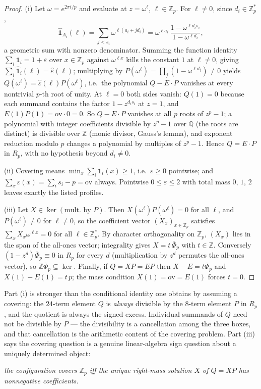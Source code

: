 \documentclass[11pt,a4paper]{article}
\numberwithin{equation}{section}
\theoremstyle{plain}
\theoremstyle{plain}
\theoremstyle{definition}
\theoremstyle{remark}
\newcommand{\Z}{\mathbb{Z}}
\begin{document}
\begin{proof}
(i) Let $\omega=e^{2\pi i/p}$ and evaluate at $z=\omega^\ell$,
$\ell\in\Z_p$. For $\ell\ne 0$, since $d_i\in\Z_p^{*}$,
\[
\widehat{\mathbf 1}_{A_i}(\ell)
=\sum_{j<s_i}\omega^{\ell(a_i+jd_i)}
=\omega^{\ell a_i}\,\frac{1-\omega^{\ell d_i s_i}}{1-\omega^{\ell d_i}},
\]
a geometric sum with nonzero denominator. Summing the function identity
$\sum_i\mathbf 1_i=1+\varepsilon$ over $x\in\Z_p$ against $\omega^{\ell x}$
kills the constant $1$ at $\ell\ne0$, giving
$\sum_i\widehat{\mathbf 1}_i(\ell)=\widehat\varepsilon(\ell)$; multiplying by
$P(\omega^\ell)=\prod_j(1-\omega^{\ell d_j})\ne 0$ yields
$Q(\omega^\ell)=\widehat\varepsilon(\ell)P(\omega^\ell)$, i.e.\ the
polynomial $Q-E\cdot P$ vanishes at every nontrivial $p$-th root of unity.
At $\ell=0$ both sides vanish: $Q(1)=0$ because each summand contains the
factor $1-z^{d_is_i}$ at $z=1$, and $E(1)P(1)=\mathrm{ov}\cdot 0=0$. So
$Q-E\cdot P$ vanishes at all $p$ roots of $z^p-1$; a polynomial with integer
coefficients divisible by $z^p-1$ over $\mathbb{Q}$ (the roots are distinct) is
divisible over $\Z$ (monic divisor, Gauss's lemma), and exponent reduction
modulo $p$ changes a polynomial by multiples of $z^p-1$. Hence
$Q=E\cdot P$ in $R_p$, with no hypothesis beyond $d_i\ne 0$.

(ii) Covering means $\min_x\sum_i\mathbf 1_i(x)\ge 1$, i.e.\ $\varepsilon\ge
0$ pointwise; and $\sum_x\varepsilon(x)=\sum_i s_i-p=\mathrm{ov}$ always.
Pointwise $0\le\varepsilon\le 2$ with total mass $0$, $1$, $2$ leaves exactly
the listed profiles.

(iii) Let $X\in\ker(\text{mult.\ by }P)$. Then $X(\omega^\ell)P
(\omega^\ell)=0$ for all $\ell$, and $P(\omega^\ell)\ne 0$ for $\ell\ne 0$,
so the coefficient vector $(X_x)_{x\in\Z_p}$ satisfies
$\sum_x X_x\omega^{\ell x}=0$ for all $\ell\in\Z_p^{*}$. By character
orthogonality on $\Z_p$, $(X_x)$ lies in the span of the all-ones vector;
integrality gives $X=t\,\overline\Phi_p$ with $t\in\Z$. Conversely
$(1-z^{d})\overline\Phi_p\equiv 0$ in $R_p$ for every $d$ (multiplication by
$z^d$ permutes the all-ones vector), so $\Z\overline\Phi_p\subseteq\ker$.
Finally, if $Q=XP=EP$ then $X-E=t\overline\Phi_p$ and
$X(1)-E(1)=t\,p$; the mass condition $X(1)=\mathrm{ov}=E(1)$ forces $t=0$.
\end{proof}

Part (i) is stronger than the conditional identity one obtains by assuming a
covering: the $24$-term element $Q$ is \emph{always} divisible by the
$8$-term element $P$ in $R_p$, and the quotient is always the signed excess.
Individual summands of $Q$ need not be divisible by $P$ --- the divisibility
is a cancellation among the three boxes, and that cancellation is the
arithmetic content of the covering problem. Part (iii) says the covering
question is a genuine linear-algebra sign question about a uniquely
determined object:
\begin{center}
\emph{the configuration covers $\Z_p$ iff the unique right-mass
solution $X$ of $Q=XP$ has nonnegative coefficients.}
\end{center}
\end{document}
